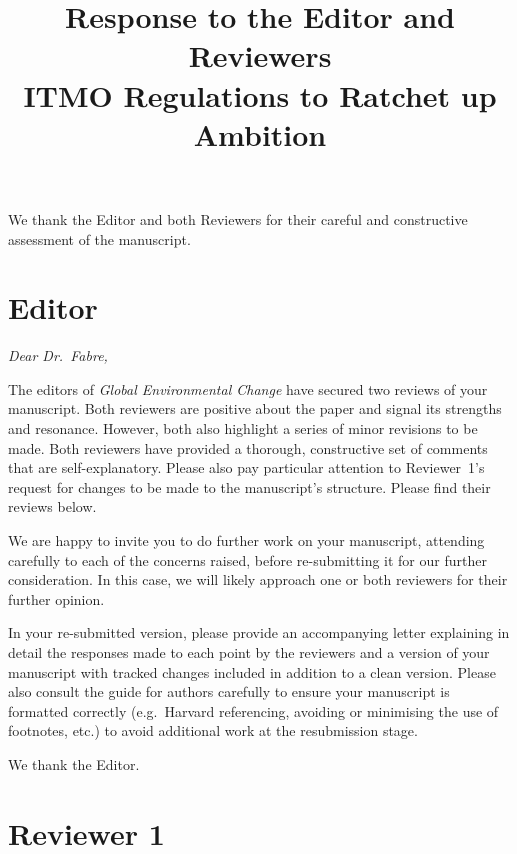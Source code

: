 \documentclass[11pt]{article}
\title{Response to the Editor and Reviewers\\[0.5em]
\large ITMO Regulations to Ratchet up Ambition}
\author{}
\date{}
\newenvironment{italic}{\itshape}{\par}
\begin{document}
\maketitle

\noindent We thank the Editor and both Reviewers for their careful and constructive assessment of the manuscript. %

\bigskip

\section*{Editor}

\begin{italic}
Dear Dr.\ Fabre,

The editors of \emph{Global Environmental Change} have secured two reviews of your manuscript. Both reviewers are positive about the paper and signal its strengths and resonance. However, both also highlight a series of minor revisions to be made. Both reviewers have provided a thorough, constructive set of comments that are self-explanatory. Please also pay particular attention to Reviewer~1's request for changes to be made to the manuscript's structure. Please find their reviews below.

We are happy to invite you to do further work on your manuscript, attending carefully to each of the concerns raised, before re-submitting it for our further consideration. In this case, we will likely approach one or both reviewers for their further opinion.

In your re-submitted version, please provide an accompanying letter explaining in detail the responses made to each point by the reviewers and a version of your manuscript with tracked changes included in addition to a clean version. Please also consult the guide for authors carefully to ensure your manuscript is formatted correctly (e.g.\ Harvard referencing, avoiding or minimising the use of footnotes, etc.) to avoid additional work at the resubmission stage.
\end{italic}



We thank the Editor.



\section*{Reviewer 1}
\end{document}
